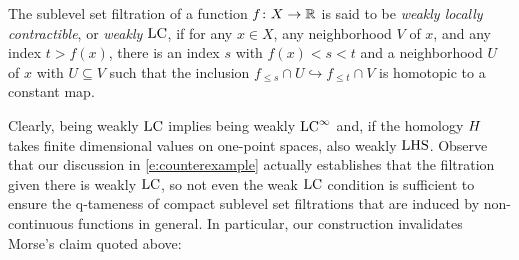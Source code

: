 \begin{defi}
	The sublevel set filtration of a function $f \colon X \to \mathbb{R}$ is said to be \emph{weakly locally contractible}, or \emph{weakly $\mathrm{LC}$}, if for any $x \in X$, any neighborhood $V$ of $x$, and any index $t > f(x)$, there is an index $s$ with $f(x) < s < t$ and a neighborhood $U$ of $x$ with $U \subseteq V$ such that the inclusion $f_{\leq s} \cap U \hookrightarrow f_{\leq t} \cap V$ is homotopic to a constant map.
\end{defi}

Clearly, being weakly $\mathrm{LC}$ implies being weakly $\mathrm{LC}^\infty$ and, if the homology $H$ takes finite dimensional values on one-point spaces, also weakly $\mathrm{LHS}$.
Observe that our discussion in \cref{e:counterexample} actually establishes that the filtration given there is weakly $\mathrm{LC}$, so not even the weak $\mathrm{LC}$ condition is sufficient to ensure the q-tameness of compact sublevel set filtrations that are induced by non-continuous functions in general.
In particular, our construction invalidates Morse's claim quoted above:
%
